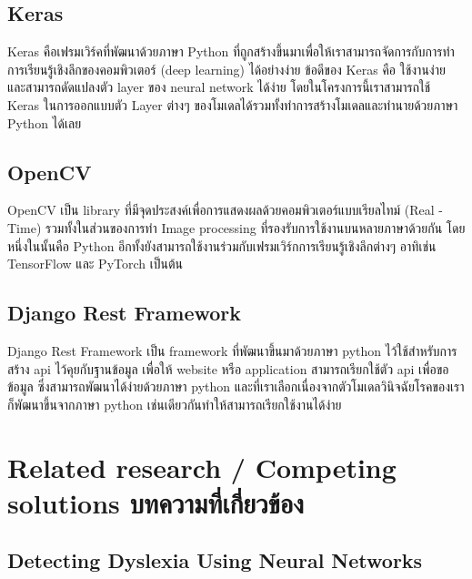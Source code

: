 \documentclass[12pt,oneside,openright,a4paper]{cpe-thai-project}
\begin{document}
\subsection{Keras}
Keras คือเฟรมเวิร์คที่พัฒนาด้วยภาษา Python ที่ถูกสร้างขึ้นมาเพื่อให้เราสามารถจัดการกับการทำ การเรียนรู้เชิงลึกของคอมพิวเตอร์ (deep learning) 
ได้อย่างง่าย ข้อดีของ Keras คือ ใช้งานง่าย และสามารถดัดแปลงตัว layer ของ neural network ได้ง่าย  โดยในโครงการนี้เราสามารถใช้ Keras 
ในการออกแบบตัว Layer ต่างๆ ของโมเดลได้รวมทั้งทำการสร้างโมเดลและทำนายด้วยภาษา Python ได้เลย

\subsection{OpenCV}
OpenCV เป็น library ที่มีจุดประสงค์เพื่อการแสดงผลด้วยคอมพิวเตอร์แบบเรียลไทม์  (Real - Time) รวมทั้งในส่วนของการทำ Image processing ที่รองรับการใช้งานบนหลายภาษาด้วยกัน
 โดยหนึ่งในนั้นคือ Python อีกทั้งยังสามารถใช้งานร่วมกับเฟรมเวิร์กการเรียนรู้เชิงลึกต่างๆ อาทิเช่น TensorFlow และ PyTorch  เป็นต้น 

\subsection{Django Rest Framework}
Django Rest Framework เป็น framework ที่พัฒนาขึ้นมาด้วยภาษา python ไว้ใช้สำหรับการสร้าง api ไว้คุยกับฐานข้อมูล  
เพื่อให้ website หรือ application สามารถเรียกใช้ตัว api เพื่อขอข้อมูล  ซึ่งสามารถพัฒนาได้ง่ายด้วยภาษา python
และที่เราเลือกเนื่องจากตัวโมเดลวินิจฉัยโรคของเราก็พัฒนาขึ้นจากภาษา python เช่นเดียวกันทำให้สามารถเรียกใช้งานได้ง่าย

\section{Related research / Competing solutions บทความที่เกี่ยวข้อง}

\subsection{Detecting Dyslexia Using Neural Networks}
\begin{figure}[!ht]\centering
  \setlength{\fboxrule}{0.2mm} %
  \setlength{\fboxsep}{1cm}
\end{figure}
\end{document}
